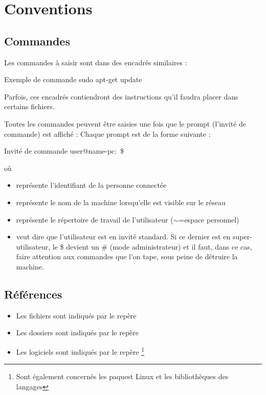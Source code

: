 

\section{Conventions}


\subsection*{Commandes}
Les commandes à saisir sont dans des encadrés similaires : \\

\begin{Bash}{Exemple de commande}
sudo apt-get update
\end{Bash}

Parfois, ces encadrés contiendront des instructions qu'il faudra placer dans certains fichiers.

Toutes les commandes peuvent être saisies une fois que le prompt (l’invité de commande) est affiché : 
Chaque prompt est de la forme suivante : \\
\begin{Bash}{Invité de commande}
user@name-pc:~\$ 
\end{Bash}

où 	

\begin{itemize}
    \item {} représente l’identifiant de la personne connectée
    \item {} représente le nom de la machine lorsqu’elle est visible sur le réseau
    \item \bold{$\sim$} représente le répertoire de travail de l’utilisateur ($\sim$=espace personnel)
    \item \bold{\$} veut dire que l'utilisateur est en invité standard. Si ce dernier est en  
super-utilisateur, le \$ devient un \# (mode administrateur) et il faut, dans ce cas, faire attention aux commandes que l’on tape, sous peine de détruire la machine.
\end{itemize}

\subsection*{Références}

\begin{itemize}
    \item Les fichiers sont indiqués par le repère 
    \item Les dossiers sont indiqués par le repère 
    \item Les logiciels sont indiqués par le repère \footnote{Sont également concernés les paquest Linux et les bibliothèques des langages}
\end{itemize}

